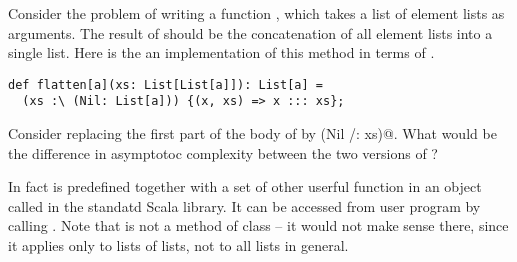 \begin{exercise} Consider the problem of writing a function ,
which takes a list of element lists as arguments. The result of
 should be the concatenation of all element lists into a
single list. Here is the an implementation of this method in terms of 
\code{:\\}.
\begin{lstlisting}
def flatten[a](xs: List[List[a]]): List[a] = 
  (xs :\ (Nil: List[a])) {(x, xs) => x ::: xs};
\end{lstlisting} 
Consider replacing the first part of the body of \lstinline@flatten@
by \lstinline@(Nil /: xs)@. What would be the difference in asymptotoc
complexity between the two versions of \lstinline@flatten@?

In fact  is predefined together with a set of other
userful function in an object called  in the standatd Scala
library. It can be accessed from user program by calling
. Note that  is not a method of class
 -- it would not make sense there, since it applies only
to lists of lists, not to all lists in general.
\end{exercise}

